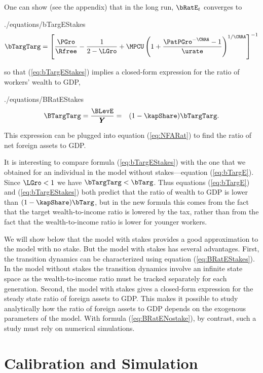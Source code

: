 \documentclass[titlepage]{\econtex}\newcommand{\texname}{cjSOE}
\renewcommand{\GDPLev}{\ensuremath{\pmb{Y}}}
\begin{document}
One can show (see the appendix) that in the long run, $\bRatE_t$ converges to
\begin{verbatimwrite}{./equations/bTargEStakes}
\begin{equation}
 \bTargTarg = \left[\frac{\PGro}{\Rfree}-\frac{1}{2-\LGro}+\MPCU \left(1+\frac{\PatPGro^{-\CRRA}-1}{\urate}\right)^{1/\CRRA}\right]^{-1}
\label{eq:bTargEStakes}
\end{equation}
\end{verbatimwrite}

so that (\ref{eq:bTargEStakes}) implies a closed-form expression for the ratio of workers' wealth to GDP,
\begin{verbatimwrite}{./equations/BRatEStakes}
\begin{eqnarray}
\BTargTarg = \frac{\BLevE}{\GDPLev} & = & (1-\kapShare ) \bTargTarg.
\label{eq:BRatEStakes}
\end{eqnarray}
\end{verbatimwrite}

This expression can be plugged into equation (\ref{eq:NFARat}) to find the ratio of net foreign assets to GDP.

It is interesting to compare formula (\ref{eq:bTargEStakes}) with the
one that we obtained for an individual in the model without
stakes---equation (\ref{eq:bTargE}). Since $\LGro<1$ we have
$\bTargTarg < \bTarg$. Thus
equations (\ref{eq:bTargE}) and (\ref{eq:bTargEStakes}) both predict
that the ratio of wealth to GDP is lower than $(1-\kapShare)
\bTarg$, but in the new formula this comes from the
fact that the target wealth-to-income ratio is lowered by the tax,
rather than from the fact that the wealth-to-income ratio is lower for
younger workers.

We will show below that the model with stakes provides a good
approximation to the model with no stake.  But the model with stakes has
several advantages. First, the transition dynamics can be
characterized using equation (\ref{eq:BRatEStakes}). In the model
without stakes the transition dynamics involve an infinite state space
as the wealth-to-income ratio must be tracked separately for each
generation. Second, the model with stakes gives a closed-form
expression for the steady state ratio of foreign assets to GDP. This
makes it possible to study analytically how the ratio of foreign
assets to GDP depends on the exogenous parameters of the model. With
formula (\ref{eq:BRatENostake}), by contrast, such a study must rely
on numerical simulations.

\section{Calibration and Simulation}
\end{document}
